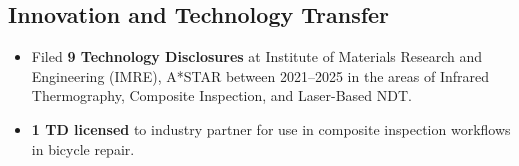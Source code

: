 \documentclass{my_cv}%
\begin{document}

\subsection{\faLightbulbO \hspace{0.5em}\bfseries Innovation and Technology Transfer}

\begin{itemize}
\setlength\itemsep{-0.1em}
  \item Filed \textbf{9 Technology Disclosures} at Institute of Materials Research and Engineering (IMRE), A*STAR between 2021–2025 in the areas of Infrared Thermography, Composite Inspection, and Laser-Based NDT.
  \item \textbf{1 TD licensed} to industry partner for use in  composite inspection workflows in bicycle repair.
\end{itemize}
\end{document}
